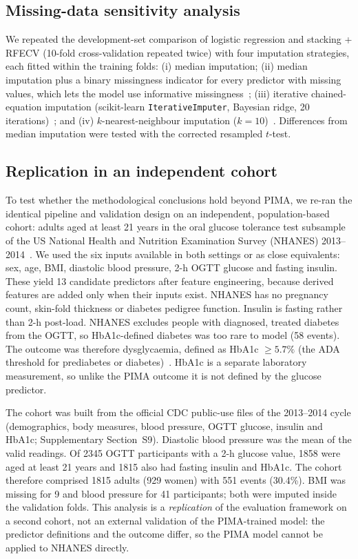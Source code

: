 \documentclass[preprint,12pt,authoryear=false]{elsarticle}
\begin{document}
\subsection{Missing-data sensitivity analysis}
\label{sec:missing-methods}
We repeated the development-set comparison of logistic regression and stacking + RFECV (10-fold cross-validation repeated twice) with four imputation strategies, each fitted within the training folds: (i) median imputation; (ii) median imputation plus a binary missingness indicator for every predictor with missing values, which lets the model use informative missingness~\cite{sperrin2020missing}; (iii) iterative chained-equation imputation (scikit-learn \texttt{IterativeImputer}, Bayesian ridge, 20 iterations)~\cite{vanbuuren2011mice}; and (iv) $k$-nearest-neighbour imputation ($k=10$)~\cite{troyanskaya2001knn}. Differences from median imputation were tested with the corrected resampled $t$-test.

\subsection{Replication in an independent cohort}
\label{sec:nhanes-methods}
To test whether the methodological conclusions hold beyond PIMA, we re-ran the identical pipeline and validation design on an independent, population-based cohort: adults aged at least 21 years in the oral glucose tolerance test subsample of the US National Health and Nutrition Examination Survey (NHANES) 2013--2014~\cite{nhanes2013}. We used the six inputs available in both settings or as close equivalents: sex, age, BMI, diastolic blood pressure, 2-h OGTT glucose and fasting insulin. These yield 13 candidate predictors after feature engineering, because derived features are added only when their inputs exist. NHANES has no pregnancy count, skin-fold thickness or diabetes pedigree function. Insulin is fasting rather than 2-h post-load. NHANES excludes people with diagnosed, treated diabetes from the OGTT, so HbA1c-defined diabetes was too rare to model (58 events). The outcome was therefore dysglycaemia, defined as HbA1c $\geq 5.7\%$ (the ADA threshold for prediabetes or diabetes)~\cite{ada2024}. HbA1c is a separate laboratory measurement, so unlike the PIMA outcome it is not defined by the glucose predictor.

The cohort was built from the official CDC public-use files of the 2013--2014 cycle (demographics, body measures, blood pressure, OGTT glucose, insulin and HbA1c; Supplementary Section~S9). Diastolic blood pressure was the mean of the valid readings. Of 2345 OGTT participants with a 2-h glucose value, 1858 were aged at least 21 years and 1815 also had fasting insulin and HbA1c. The cohort therefore comprised 1815 adults (929 women) with 551 events (30.4\%). BMI was missing for 9 and blood pressure for 41 participants; both were imputed inside the validation folds. This analysis is a \emph{replication} of the evaluation framework on a second cohort, not an external validation of the PIMA-trained model: the predictor definitions and the outcome differ, so the PIMA model cannot be applied to NHANES directly.
\end{document}
